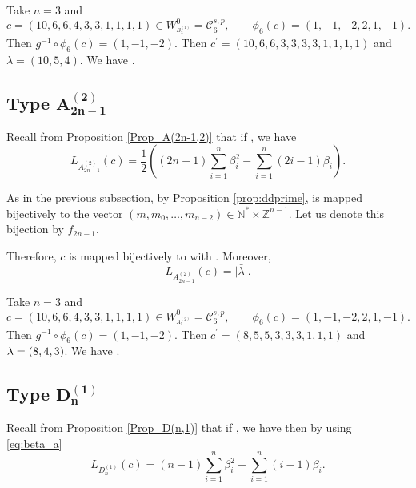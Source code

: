 \documentclass[10pt,a4paper]{amsart}
\numberwithin{equation}{section}
\newcommand{\cC}{\mathcal{C}}
\newcommand{\Z}{\mathbb{Z}}
\newcommand{\N}{\mathbb{N}}
\begin{document}
\begin{Example}
	Take $n=3$ and
\[
c=(10,6,6,4,3,3,1,1,1,1)\in W_{^{B_{3}^{(1)}}}^{0}=\mathcal{C}_{6}^{s,p}, \qquad \phi_{6}(c)=(1,-1,-2,2,1,-1).
\]
 Then $g^{-1}\circ\phi_{6}(c)=(1,-1,-2)$. Then $c^{\prime }=(10,6,6,3,3,3,3,1,1,1,1)$ and $\bar{\lambda}=(10,5,4)$. We have .
\end{Example}

\subsection[Type A\_\{2n-1\}\^{}(2)]{Type $\boldsymbol{A_{2n-1}^{(2)}}$}

Recall from Proposition \ref{Prop_A(2n-1,2)} that if , we have
\begin{equation*}
L_{A_{2n-1}^{(2)}}(c)=\frac{1}{2} \left((2n-1)\sum_{i=1}^n\beta_i^2-\sum_{i=1}^n (2i-1)\beta_i\right).
\end{equation*}

As in the previous subsection, by Proposition \ref{prop:ddprime}, \smash{$\bar{
	\lambda}\in\cC_{2n-1}^{d,\mathrm{tr},r}$} is mapped bijectively to the vector
$(m,m_0,\dots,m_{n-2})\in\N^*\times \Z^{n-1}$. Let us denote this bijection
by $f_{2n-1}$.

Therefore, $c$ is mapped bijectively to \smash{$\bar{\lambda}\in\cC_{2n-1}^{d,%
	\mathrm{tr},r}$} with . Moreover,
\begin{equation*}
L_{A_{2n-1}^{(2)}}(c)=\bigl\lvert \bar{\lambda}\bigr\rvert.
\end{equation*}

\begin{Example}
	Take $n=3$ and
\[
c=(10,6,6,4,3,3,1,1,1,1)\in W_{^{A_{5}^{(2)}}}^{0}=\mathcal{C%
	}_{6}^{s,p}, \qquad \phi_{6}(c)=(1,-1,-2,2,1,-1).
\]
 Then $g^{-1}\circ%
	\phi_{6}(c)=(1,-1,-2)$. Then $c^{\prime }=(8,5,5,3,3,3,1,1,1)$ and $\bar{%
		\lambda}=(8,4,3)$. We have .
\end{Example}

\subsection[Type D\_n\^{}(1)]{Type $\boldsymbol{D_{n}^{(1)}}$}

Recall from Proposition \ref{Prop_D(n,1)} that if , we have then by using \eqref{eq:beta_a}
\begin{equation*}
L_{D_{n}^{(1)}}(c)=(n-1)\sum_{i=1}^{n}\beta
_{i}^{2}-\sum_{i=1}^{n}(i-1)\beta _{i}.
\end{equation*}
\end{document}
